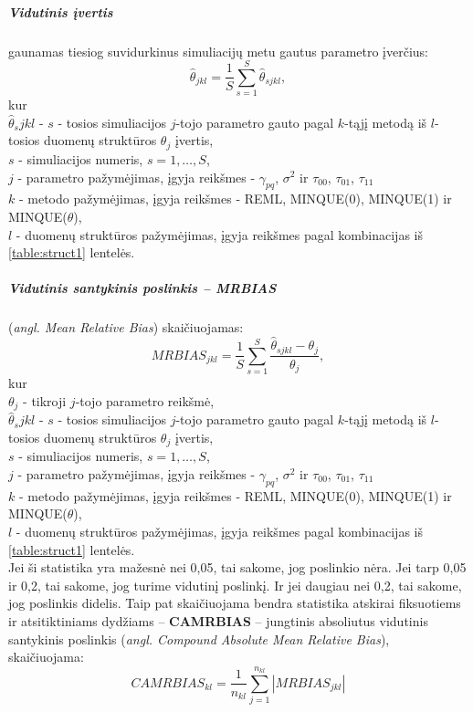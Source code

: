 \documentclass[11pt,a4paper]{article}
\begin{document}
\subparagraph{Vidutinis įvertis} gaunamas tiesiog suvidurkinus simuliacijų metu gautus parametro įverčius:
\[
\hat{\theta}_{jkl}=\frac{1}{S}\sum_{s=1}^S\hat{\theta}_{sjkl},
\]
kur \\
$\hat{\theta}_sjkl$ - $s$ - tosios simuliacijos $j$-tojo parametro gauto pagal $k$-tąjį metodą iš $l$-tosios duomenų struktūros $\theta_j$ įvertis,\\
$s$ - simuliacijos numeris, $s=1,\dots,S$,\\
$j$ - parametro pažymėjimas, įgyja reikšmes - $\gamma_{pq}$, $\sigma^2$ ir $\tau_{00}$,  $\tau_{01}$,  $\tau_{11}$\\
$k$ - metodo pažymėjimas, įgyja reikšmes - REML, MINQUE(0), MINQUE(1) ir MINQUE($\theta$),\\
$l$ - duomenų struktūros pažymėjimas, įgyja reikšmes pagal kombinacijas iš \ref{table:struct1} lentelės.\\

\subparagraph{Vidutinis santykinis poslinkis -- MRBIAS} (\textit{angl. Mean Relative Bias}) skaičiuojamas:
\[
MRBIAS_{jkl}=\frac{1}{S}\sum_{s=1}^S\frac{\hat{\theta}_{sjkl}-\theta_j}{\theta_j},
\]
kur \\
$\theta_j$ - tikroji $j$-tojo parametro reikšmė, \\
$\hat{\theta}_sjkl$ - $s$ - tosios simuliacijos $j$-tojo parametro gauto pagal $k$-tąjį metodą iš $l$-tosios duomenų struktūros $\theta_j$ įvertis,\\
$s$ - simuliacijos numeris, $s=1,\dots,S$,\\
$j$ - parametro pažymėjimas, įgyja reikšmes - $\gamma_{pq}$, $\sigma^2$ ir $\tau_{00}$,  $\tau_{01}$,  $\tau_{11}$\\
$k$ - metodo pažymėjimas, įgyja reikšmes - REML, MINQUE(0), MINQUE(1) ir MINQUE($\theta$),\\
$l$ - duomenų struktūros pažymėjimas, įgyja reikšmes pagal kombinacijas iš \ref{table:struct1} lentelės.\\
\indent Jei ši statistika yra mažesnė nei 0,05, tai sakome, jog poslinkio nėra. Jei tarp 0,05 ir 0,2, tai sakome, jog turime vidutinį poslinkį. Ir jei daugiau nei 0,2, tai sakome, jog poslinkis didelis. Taip pat skaičiuojama bendra statistika atskirai fiksuotiems ir atsitiktiniams dydžiams -- \textbf{CAMRBIAS} -- jungtinis absoliutus vidutinis santykinis poslinkis (\textit{angl. Compound Absolute Mean Relative Bias}), skaičiuojama:
\[
CAMRBIAS_{kl}=\frac{1}{n_{kl}}\sum_{j=1}^{n_{kl}}\left|MRBIAS_{jkl}\right|
\]
\end{document}
